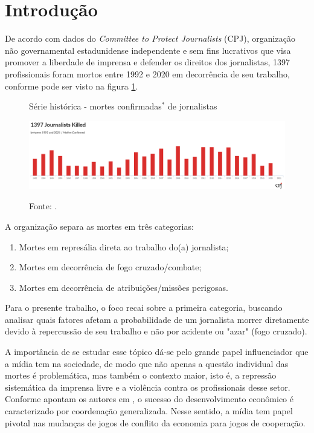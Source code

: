 \documentclass[12pt,
               openright,
               oneside,
               a4paper,
							 section=TITLE,     %
               subsection=Title,  %
               english,brazil]{article}
\begin{document}
\section{Introdução}

De acordo com dados do \textit{Committee to Protect Journalists} (CPJ), organização não governamental estadunidense independente e sem fins lucrativos que visa promover a liberdade de imprensa e defender os direitos dos jornalistas, 1397 profissionais foram mortos entre 1992 e 2020 em decorrência de seu trabalho, conforme pode ser visto na figura \ref{fig:serie_historica}.

\begin{figure}[H]
	\centering
	\caption{Série histórica - mortes confirmadas$^*$ de jornalistas }
	\label{fig:serie_historica}
	\includegraphics[width=\linewidth]{"Figuras/serie_mortes.png"} \\
\caption*{Fonte: \cite{CPJ2020}.}
\end{figure}

A organização separa as mortes em três categorias:
\begin{enumerate}
    \item Mortes em represália direta ao trabalho do(a) jornalista;
    
    \item Mortes em decorrência de fogo cruzado/combate;
    
    \item Mortes em decorrência de atribuições/missões perigosas.
\end{enumerate}

Para o presente trabalho, o foco recai sobre a primeira categoria, buscando analisar quais fatores afetam a probabilidade de um jornalista morrer diretamente devido à repercussão de seu trabalho e não por acidente ou "azar" (fogo cruzado).

A importância de se estudar esse tópico dá-se pelo grande papel influenciador que a mídia tem na sociedade, de modo que não apenas a questão individual das mortes é problemática, mas também o contexto maior, isto é, a repressão sistemática da imprensa livre e a violência contra os profissionais desse setor. Conforme apontam os autores em , o sucesso do desenvolvimento econômico  é caracterizado por coordenação generalizada. Nesse sentido, a mídia tem papel pivotal nas mudanças de jogos de conflito da economia para jogos de cooperação.
\end{document}
